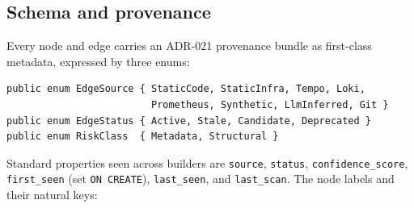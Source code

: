 \documentclass[11pt]{article}
\begin{document}
\subsection{Schema and provenance}

Every node and edge carries an ADR-021 provenance bundle as first-class metadata,
expressed by three enums:

\begin{verbatim}
public enum EdgeSource { StaticCode, StaticInfra, Tempo, Loki,
                         Prometheus, Synthetic, LlmInferred, Git }
public enum EdgeStatus { Active, Stale, Candidate, Deprecated }
public enum RiskClass  { Metadata, Structural }
\end{verbatim}

Standard properties seen across builders are \texttt{source}, \texttt{status},
\texttt{confidence\_score}, \texttt{first\_seen} (set \texttt{ON CREATE}),
\texttt{last\_seen}, and \texttt{last\_scan}. The node labels and their natural
keys:
\end{document}
